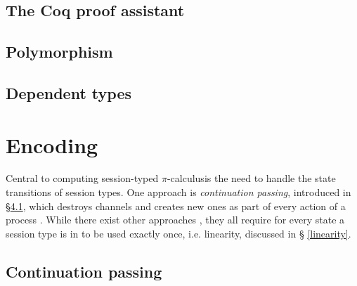 \documentclass{mproj}
\newcommand{\picalc}{$\pi$-calculus}
\begin{document}
\section{The Coq proof assistant}\label{coq}


\section{Polymorphism}\label{polymorphism}

\cite{Wadler1989}

\section{Dependent types}\label{dependent-types}

\chapter{Encoding}\label{encoding}

Central to computing session-typed \picalc is the need to handle the state
transitions of session types. One approach is \textit{continuation passing},
introduced in \S \ref{continuation-passing}, which destroys channels and creates
new ones as part of every action of a process \cite{Dardha2016m}. While there
exist other approaches , they all require for every state
a session type is in to be used exactly once, i.e. linearity, discussed in \S
\ref{linearity}.

\section{Continuation passing}\label{continuation-passing}
\end{document}
